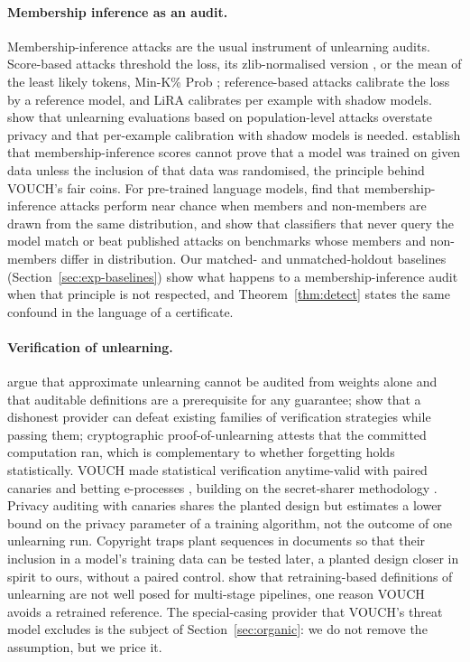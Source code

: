 \paragraph{Membership inference as an audit.} Membership-inference attacks are the usual
instrument of unlearning audits. Score-based attacks threshold the loss, its
zlib-normalised version \citep{carlini2021extracting}, or the mean of the least likely
tokens, Min-K\% Prob \citep{shi2024mink}; reference-based attacks calibrate the loss by a
reference model, and LiRA \citep{carlini2022lira} calibrates per example with shadow
models. \citet{hayes2024inexact} show that unlearning evaluations based on
population-level attacks overstate privacy and that per-example calibration with
shadow models is needed. \citet{zhang2024mia} establish that membership-inference
scores cannot prove that a model was trained on given data unless the inclusion of that
data was randomised, the principle behind VOUCH's fair coins. For pre-trained language
models, \citet{duan2024membership} find that membership-inference attacks perform near
chance when members and non-members are drawn from the same distribution, and
\citet{das2024blind} show that classifiers that never query the model match or beat published
attacks on benchmarks whose members and non-members differ in distribution. Our matched- and
unmatched-holdout baselines (Section~\ref{sec:exp-baselines}) show what happens to a
membership-inference audit when that principle is not respected, and
Theorem~\ref{thm:detect} states the same confound in the language of a certificate.

\paragraph{Verification of unlearning.} \citet{thudi2022necessity} argue that
approximate unlearning cannot be audited from weights alone and that auditable
definitions are a prerequisite for any guarantee; \citet{zhang2024verification} show
that a dishonest provider can defeat existing families of verification strategies while
passing them; cryptographic proof-of-unlearning \citep{eisenhofer2025verifiable} attests
that the committed computation ran, which is complementary to whether forgetting holds
statistically. VOUCH \citep{dang2026vouch} made statistical verification anytime-valid
with paired canaries and betting e-processes
\citep{waudbysmith2024,ramdas2023game,shafer2021testing,grunwald2024safe}, building on
the secret-sharer methodology \citep{carlini2019secret}. Privacy auditing with
canaries \citep{steinke2023privacy} shares the planted design but estimates a lower
bound on the privacy parameter of a training algorithm, not the outcome of one
unlearning run. Copyright traps \citep{meeus2024traps} plant sequences in documents so
that their inclusion in a model's training data can be tested later, a planted design
closer in spirit to ours, without a paired control.
\citet{yu2025impossibility} show that retraining-based definitions of unlearning are not
well posed for multi-stage pipelines, one reason VOUCH avoids a retrained reference.
The special-casing provider that VOUCH's threat model excludes is the subject of
Section~\ref{sec:organic}: we do not remove the assumption, but we price it.

